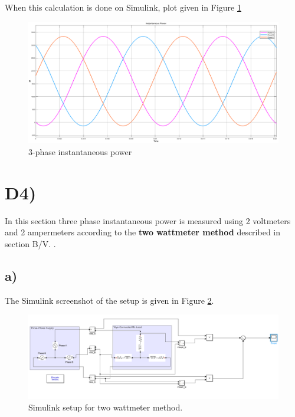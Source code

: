 \documentclass[letterpaper,12pt]{article}
\begin{document}
When this calculation is done on Simulink, plot given in Figure \ref*{D3}
\begin{figure}[H]
    \centering
    \includegraphics[width = 1\textwidth]{3.png}
    \caption{3-phase instantaneous power}
    \label{D3}
\end{figure}


\section{D4)}
In this section three phase instantaneous power is measured using 2 voltmeters and 2 ampermeters according to the \textbf{two wattmeter method} described in section B/V. .

\subsection{a)}

The Simulink screenshot of the setup is given in Figure \ref*{D4a}.

\begin{figure}[H]
    \centering
    \includegraphics[width = 1\textwidth]{4a.png}
    \caption{Simulink setup for two wattmeter method.}
    \label{D4a}
\end{figure} 
\end{document}
